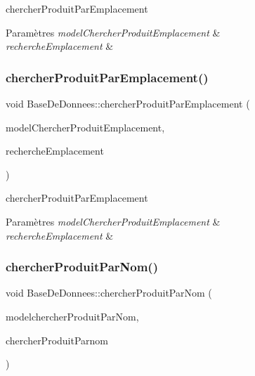 chercher\+Produit\+Par\+Emplacement 


\begin{DoxyParams}{Paramètres}
{\em model\+Chercher\+Produit\+Emplacement} & \\
\hline
{\em recherche\+Emplacement} & \\
\hline
\end{DoxyParams}
\mbox{\label{class_base_de_donnees_a7741ad517714e619d7f8a0f202d3b38d}} 
\subsubsection{\texorpdfstring{chercher\+Produit\+Par\+Emplacement()}{chercherProduitParEmplacement()}\hspace{0.1cm}{\footnotesize\ttfamily [2/2]}}
{\footnotesize\ttfamily void Base\+De\+Donnees\+::chercher\+Produit\+Par\+Emplacement (\begin{DoxyParamCaption}\item[{Q\+Sql\+Query\+Model $\ast$}]{model\+Chercher\+Produit\+Emplacement,  }\item[{Q\+String}]{recherche\+Emplacement }\end{DoxyParamCaption})}



chercher\+Produit\+Par\+Emplacement 


\begin{DoxyParams}{Paramètres}
{\em model\+Chercher\+Produit\+Emplacement} & \\
\hline
{\em recherche\+Emplacement} & \\
\hline
\end{DoxyParams}
\mbox{\label{class_base_de_donnees_a49d9a59025c2342adc820849bffb5532}} 
\subsubsection{\texorpdfstring{chercher\+Produit\+Par\+Nom()}{chercherProduitParNom()}\hspace{0.1cm}{\footnotesize\ttfamily [1/2]}}
{\footnotesize\ttfamily void Base\+De\+Donnees\+::chercher\+Produit\+Par\+Nom (\begin{DoxyParamCaption}\item[{Q\+Sql\+Query\+Model $\ast$}]{modelchercher\+Produit\+Par\+Nom,  }\item[{Q\+String}]{chercher\+Produit\+Parnom }\end{DoxyParamCaption})}



